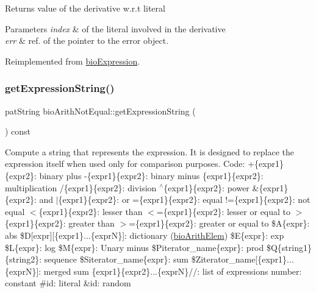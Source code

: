 \begin{DoxyReturn}{Returns}
value of the derivative w.\+r.\+t literal 
\end{DoxyReturn}

\begin{DoxyParams}{Parameters}
{\em index} & of the literal involved in the derivative \\
\hline
{\em err} & ref. of the pointer to the error object. \\
\hline
\end{DoxyParams}


Reimplemented from \hyperlink{classbio_expression_a5915579d1193f25f216c1e273c97f2ce}{bio\+Expression}.

\mbox{\label{classbio_arith_not_equal_a8fe4fd578218783f3a18665eae9f750c}} 
\subsubsection{\texorpdfstring{get\+Expression\+String()}{getExpressionString()}}
{\footnotesize\ttfamily pat\+String bio\+Arith\+Not\+Equal\+::get\+Expression\+String (\begin{DoxyParamCaption}{ }\end{DoxyParamCaption}) const\hspace{0.3cm}{\ttfamily [virtual]}}

Compute a string that represents the expression. It is designed to replace the expression itself when used only for comparison purposes. Code\+: +\{expr1\}\{expr2\}\+: binary plus -\/\{expr1\}\{expr2\}\+: binary minus \{expr1\}\{expr2\}\+: multiplication /\{expr1\}\{expr2\}\+: division $^\wedge$\{expr1\}\{expr2\}\+: power \&\{expr1\}\{expr2\}\+: and $\vert$\{expr1\}\{expr2\}\+: or =\{expr1\}\{expr2\}\+: equal !=\{expr1\}\{expr2\}\+: not equal $<$\{expr1\}\{expr2\}\+: lesser than $<$=\{expr1\}\{expr2\}\+: lesser or equal to $>$\{expr1\}\{expr2\}\+: greater than $>$=\{expr1\}\{expr2\}\+: greater or equal to \$A\{expr\}\+: abs \$D\mbox{[}expr\mbox{]}\mbox{[}\{expr1\}...\{exprN\}\mbox{]}\+: dictionary (\hyperlink{classbio_arith_elem}{bio\+Arith\+Elem}) \$E\{expr\}\+: exp \$L\{expr\}\+: log \$M\{expr\}\+: Unary minus \$\+Piterator\+\_\+name\{expr\}\+: prod \$Q\{string1\}\{string2\}\+: sequence \$\+Siterator\+\_\+name\{expr\}\+: sum \$\+Ziterator\+\_\+name\mbox{[}\{expr1\}...\{exprN\}\mbox{]}\+: merged sum \{expr1\}\{expr2\}...\{exprN\}//\+: list of expressions number\+: constant \#id\+: literal \&id\+: random 

